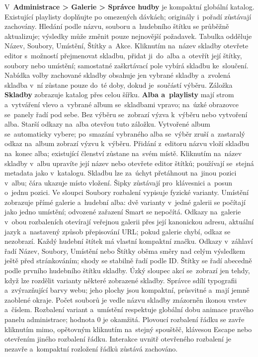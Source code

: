 \documentclass[11pt,a4paper]{article}
\newcommand{\ui}[1]{\textbf{#1}}
\begin{document}
V~\ui{Administrace > Galerie > Správce hudby} je kompaktní globální katalog.
Existující playlisty doplňujte po omezených dávkách; originály i~pořadí
zůstávají zachovány. Hledání podle názvu, souboru a~hudebního štítku se
průběžně aktualizuje; výsledky může změnit pouze nejnovější požadavek. Tabulka
odděluje Název, Soubory, Umístění, Štítky a~Akce. Kliknutím na~název skladby
otevřete editor s~možností přejmenovat skladbu, přidat ji~do~alba a~otevřít její
štítky, soubory nebo umístění; samostatné zaškrtávací pole vybírá skladbu
ke~sloučení.
Nabídka volby zachované skladby obsahuje jen vybrané skladby a~zvolená skladba
v~ní zůstane pouze do~té doby, dokud je~součástí výběru.
Záložka \ui{Skladby} zobrazuje katalog přes celou šířku. \ui{Alba a~playlisty}
mají strom a~vytváření vlevo a~vybrané album se~skladbami vpravo; na~úzké
obrazovce
se~panely řadí pod sebe. Bez výběru se~zobrazí výzva k~výběru nebo vytvoření
alba.
Starší odkazy na~alba otevřou tuto záložku. Vytvořené album se~automaticky
vybere;
po~smazání vybraného alba se~výběr zruší a~zastaralý odkaz na~album zobrazí
výzvu
k~výběru. Přidání z~editoru názvu vloží skladbu na~konec alba; existující
členství
zůstane na~svém místě. Kliknutím na~název skladby v~albu upravíte její název
nebo otevřete editor štítků; používají se~stejná metadata jako v~katalogu.
Skladbu lze za~úchyt přetáhnout na~jinou pozici v~albu; čára ukazuje místo
vložení. Šipky zůstávají pro~klávesnici a~posun o~jednu
pozici.
Ve sloupci Soubory rozbalení vypisuje fyzické varianty. Umístění zobrazuje
přímé galerie a~hudební alba: dvě varianty v~jedné galerii se počítají jako
jedno
umístění; odvozené zařazení Smart se nepočítá. Odkazy na~galerie v~obou
rozbaleních otevírají veřejnou galerii přes její kanonickou adresu, aktuální
jazyk a~nastavený způsob přepisování URL; pokud galerie chybí, odkaz se
nezobrazí.
Každý hudební štítek má vlastní kompaktní značku.
Odkazy v~záhlaví řadí Název, Soubory, Umístění nebo Štítky oběma směry nad
celým výsledkem ještě před stránkováním; shody se stabilně řadí podle ID.
Štítky se řadí abecedně podle prvního hudebního štítku skladby.
Úzký sloupec akcí se~zobrazí jen tehdy, když lze rozdělit varianty některé
zobrazené skladby.
Správce sdílí typografii a~zvýrazňující barvy webu; jeho plochy jsou kompaktní,
průsvitné a~mají jemně zaoblené okraje. Počet souborů je vedle názvu skladby
znázorněn ikonou vrstev a~číslem. Rozbalení variant a~umístění respektuje
globální dobu animace pravého panelu administrace; hodnota 0 je okamžitá.
Plovoucí rozbalení řádku se zavře kliknutím mimo, opětovným kliknutím na~stejný
spouštěč, klávesou Escape nebo otevřením jiného rozbalení řádku. Interakce
uvnitř
otevřeného rozbalení je nezavře a~kompaktní rozložení řádků zůstává zachováno.
\end{document}
